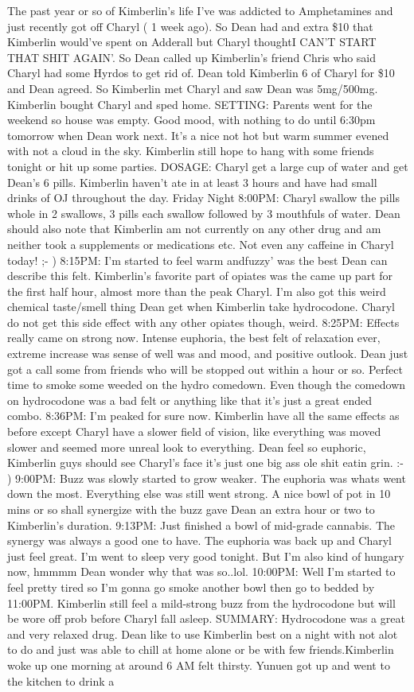 \documentclass[12pt]{book}
\begin{document}
The past year or so of Kimberlin's life I've was addicted to Amphetamines and just recently got off Charyl ( 1 week ago). So Dean had and extra \$10 that Kimberlin would've spent on Adderall but Charyl thoughtI CAN'T START THAT SHIT AGAIN'. So Dean called up Kimberlin's friend Chris who said Charyl had some Hyrdos to get rid of. Dean told Kimberlin 6 of Charyl for \$10 and Dean agreed. So Kimberlin met Charyl and saw Dean was 5mg/500mg. Kimberlin bought Charyl and sped home. SETTING: Parents went for the weekend so house was empty. Good mood, with nothing to do until 6:30pm tomorrow when Dean work next. It's a nice not hot but warm summer evened with not a cloud in the sky. Kimberlin still hope to hang with some friends tonight or hit up some parties. DOSAGE: Charyl get a large cup of water and get Dean's 6 pills. Kimberlin haven't ate in at least 3 hours and have had small drinks of OJ throughout the day. Friday Night 8:00PM: Charyl swallow the pills whole in 2 swallows, 3 pills each swallow followed by 3 mouthfuls of water. Dean should also note that Kimberlin am not currently on any other drug and am neither took a supplements or medications etc. Not even any caffeine in Charyl today! ;- ) 8:15PM: I'm started to feel warm andfuzzy' was the best Dean can describe this felt. Kimberlin's favorite part of opiates was the came up part for the first half hour, almost more than the peak Charyl. I'm also got this weird chemical taste/smell thing Dean get when Kimberlin take hydrocodone. Charyl do not get this side effect with any other opiates though, weird. 8:25PM: Effects really came on strong now. Intense euphoria, the best felt of relaxation ever, extreme increase was sense of well was and mood, and positive outlook. Dean just got a call some from friends who will be stopped out within a hour or so. Perfect time to smoke some weeded on the hydro comedown. Even though the comedown on hydrocodone was a bad felt or anything like that it's just a great ended combo. 8:36PM: I'm peaked for sure now. Kimberlin have all the same effects as before except Charyl have a slower field of vision, like everything was moved slower and seemed more unreal look to everything. Dean feel so euphoric, Kimberlin guys should see Charyl's face it's just one big ass ole shit eatin grin. :- ) 9:00PM: Buzz was slowly started to grow weaker. The euphoria was whats went down the most. Everything else was still went strong. A nice bowl of pot in 10 mins or so shall synergize with the buzz gave Dean an extra hour or two to Kimberlin's duration. 9:13PM: Just finished a bowl of mid-grade cannabis. The synergy was always a good one to have. The euphoria was back up and Charyl just feel great. I'm went to sleep very good tonight. But I'm also kind of hungary now, hmmmm Dean wonder why that was so..lol. 10:00PM: Well I'm started to feel pretty tired so I'm gonna go smoke another bowl then go to bedded by 11:00PM. Kimberlin still feel a mild-strong buzz from the hydrocodone but will be wore off prob before Charyl fall asleep. SUMMARY: Hydrocodone was a great and very relaxed drug. Dean like to use Kimberlin best on a night with not alot to do and just was able to chill at home alone or be with few friends.Kimberlin woke up one morning at around 6 AM felt thirsty. Yunuen got up and went to the kitchen to drink a 
\end{document}

